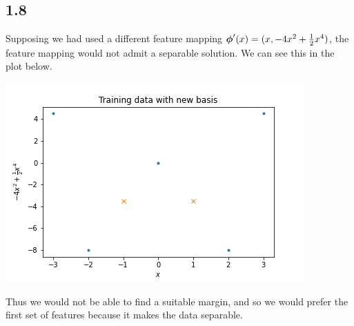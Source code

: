 \documentclass[submit]{harvardml}
\begin{document}
\subsection*{1.8}

Supposing we had used a different feature mapping $\boldsymbol{\phi}'(x) = (x, -4 x^2 + \frac{1}{2} x^4)$, the feature mapping would not admit a separable solution. We can see this in the plot below.

\includegraphics{plots/1-8.png}

Thus we would not be able to find a suitable margin, and so we would prefer the first set of features because it makes the data separable.

\newpage

\end{document}
